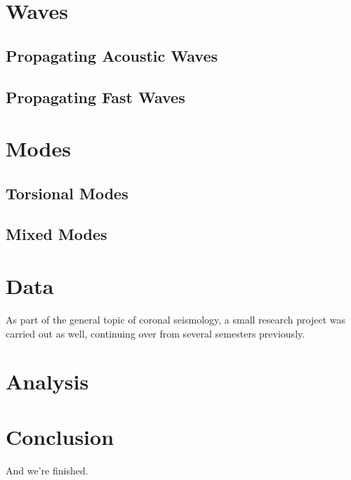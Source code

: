 \documentclass[preprint2]{aastex}
\begin{document}
\section{Waves}
\subsection{Propagating Acoustic Waves}
\subsection{Propagating Fast Waves}
\section{Modes}
\subsection{Torsional Modes}
\subsection{Mixed Modes}

\section{Data}\label{data}
As part of the general topic of coronal seismology,
a small research project was carried out as well, continuing
over from several semesters previously.

\section{Analysis}\label{analysis}

\section{Conclusion}\label{conclusion}
And we're finished.


\end{document}
